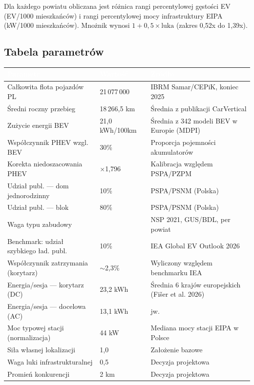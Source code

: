 \documentclass[11pt,a4paper]{article}
\begin{document}
	Dla każdego powiatu obliczana jest różnica rangi percentylowej gęstości EV (EV/1000 mieszkańców) i rangi percentylowej mocy infrastruktury EIPA (kW/1000 mieszkańców). Mnożnik wynosi $1 + 0{,}5 \times \text{luka}$ (zakres 0,52x do 1,39x).
	
	\subsection{Tabela parametrów}
	
	\begin{longtable}{p{4.3cm}p{3.1cm}p{6.5cm}}
		\toprule
		\rowcolor{granatowy}
		\textcolor{white}{\textbf{Parametr}} & \textcolor{white}{\textbf{Wartość}} & \textcolor{white}{\textbf{Źródło}} \\
		\midrule
		\endhead
		Całkowita flota pojazdów PL & 21\,077\,000 & IBRM Samar/CEPiK, koniec 2025 \\
		Średni roczny przebieg & 18\,266,5 km & Średnia z publikacji CarVertical \\
		Zużycie energii BEV & 21,0 kWh/100km & Średnia z 342 modeli BEV w Europie (MDPI) \\
		Współczynnik PHEV wzgl. BEV & 30\% & Proporcja pojemności akumulatorów \\
		Korekta niedoszacowania PHEV & $\times$1,796 & Kalibracja względem PSPA/PZPM \\
		Udział publ. --- dom jednorodzinny & 10\% & PSPA/PSNM (Polska) \\
		Udział publ. --- blok & 80\% & PSPA/PSNM (Polska) \\
		Waga typu zabudowy & \seqsplit{udzial\_jednorodzinne\_nsp} & NSP 2021, GUS/BDL, per powiat \\
		Benchmark: udział szybkiego ład. publ. & 10\% & IEA Global EV Outlook 2026 \\
		Współczynnik zatrzymania (korytarz) & $\sim$2,3\% & Wyliczony względem benchmarku IEA \\
		Energia/sesja --- korytarz (DC) & 23,2 kWh & Średnia 6 krajów europejskich (Fišer et al. 2026) \\
		Energia/sesja --- docelowa (AC) & 13,1 kWh & jw. \\
		Moc typowej stacji (normalizacja) & 44 kW & Mediana mocy stacji EIPA w Polsce \\
		Siła własnej lokalizacji & 1,0 & Założenie bazowe \\
		Waga luki infrastrukturalnej & 0,5 & Decyzja projektowa \\
		Promień konkurencji & 2 km & Decyzja projektowa \\

\end{longtable}
\end{document}
